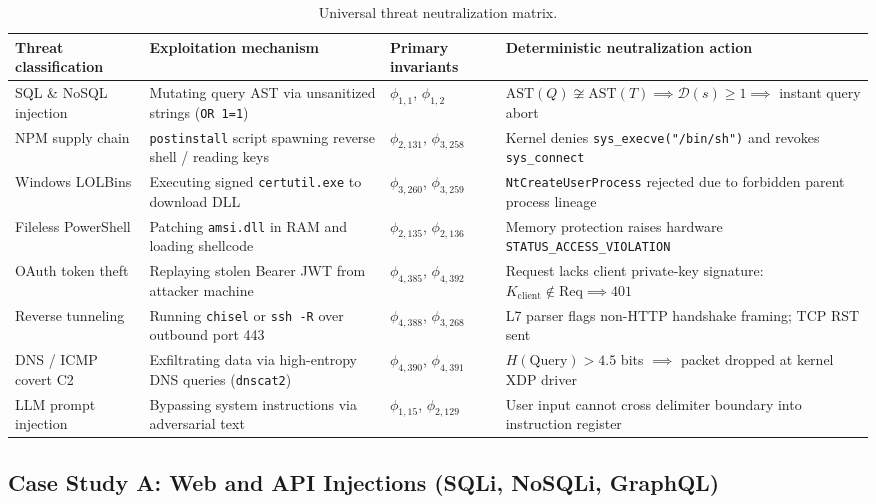 \documentclass{portalciencia}
\theoremstyle{plain}
\theoremstyle{definition}
\begin{document}
\begin{table}[ht]
\centering
\caption{Universal threat neutralization matrix.}
\label{tab:threats}
\small
\begin{tabular}{p{2.5cm}p{3.9cm}p{1.9cm}p{4.6cm}}
\toprule
Threat classification & Exploitation mechanism & Primary invariants & Deterministic neutralization action \\
\midrule
SQL \& NoSQL injection & Mutating query AST via unsanitized strings (\texttt{OR 1=1}) & $\phi_{1,1}$, $\phi_{1,2}$ & $\mathrm{AST}(Q) \not\cong \mathrm{AST}(T) \implies \mathcal{D}(s) \ge 1 \implies$ instant query abort \\
\addlinespace
NPM supply chain & \texttt{postinstall} script spawning reverse shell / reading keys & $\phi_{2,131}$, $\phi_{3,258}$ & Kernel denies \texttt{sys\_execve("/bin/sh")} and revokes \texttt{sys\_connect} \\
\addlinespace
Windows LOLBins & Executing signed \texttt{certutil.exe} to download DLL & $\phi_{3,260}$, $\phi_{3,259}$ & \texttt{NtCreateUserProcess} rejected due to forbidden parent process lineage \\
\addlinespace
Fileless PowerShell & Patching \texttt{amsi.dll} in RAM and loading shellcode & $\phi_{2,135}$, $\phi_{2,136}$ & Memory protection raises hardware \texttt{STATUS\_ACCESS\_VIOLATION} \\
\addlinespace
OAuth token theft & Replaying stolen Bearer JWT from attacker machine & $\phi_{4,385}$, $\phi_{4,392}$ & Request lacks client private-key signature: $K_{\mathrm{client}} \notin \mathrm{Req} \implies 401$ \\
\addlinespace
Reverse tunneling & Running \texttt{chisel} or \texttt{ssh -R} over outbound port 443 & $\phi_{4,388}$, $\phi_{3,268}$ & L7 parser flags non-HTTP handshake framing; TCP RST sent \\
\addlinespace
DNS / ICMP covert C2 & Exfiltrating data via high-entropy DNS queries (\texttt{dnscat2}) & $\phi_{4,390}$, $\phi_{4,391}$ & $H(\mathrm{Query}) > 4.5$ bits $\implies$ packet dropped at kernel XDP driver \\
\addlinespace
LLM prompt injection & Bypassing system instructions via adversarial text & $\phi_{1,15}$, $\phi_{2,129}$ & User input cannot cross delimiter boundary into instruction register \\
\bottomrule
\end{tabular}
\end{table}

\subsection{Case Study A: Web and API Injections (SQLi, NoSQLi, GraphQL)}
\end{document}
